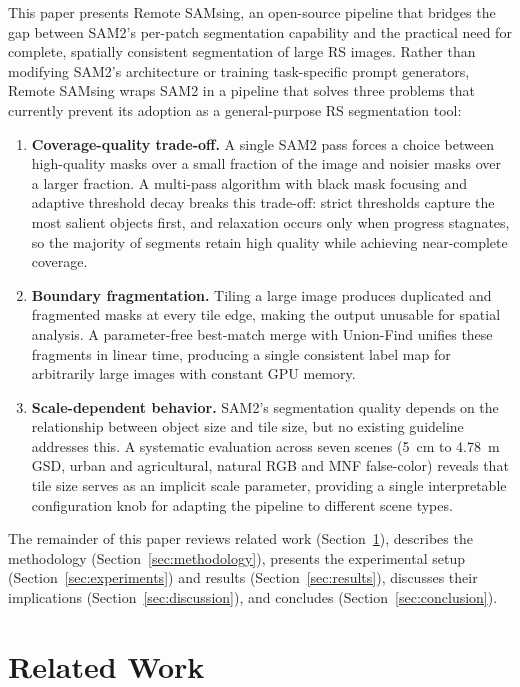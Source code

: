 \documentclass[review,11pt,authoryear]{elsarticle}
\begin{document}
This paper presents Remote SAMsing, an open-source pipeline that bridges the gap between SAM2's per-patch segmentation capability and the practical need for complete, spatially consistent segmentation of large RS images. Rather than modifying SAM2's architecture or training task-specific prompt generators, Remote SAMsing wraps SAM2 in a pipeline that solves three problems that currently prevent its adoption as a general-purpose RS segmentation tool:
\pagebreak
\begin{enumerate}
    \item \textbf{Coverage-quality trade-off.} A single SAM2 pass forces a choice between high-quality masks over a small fraction of the image and noisier masks over a larger fraction. A multi-pass algorithm with black mask focusing and adaptive threshold decay breaks this trade-off: strict thresholds capture the most salient objects first, and relaxation occurs only when progress stagnates, so the majority of segments retain high quality while achieving near-complete coverage.
    \item \textbf{Boundary fragmentation.} Tiling a large image produces duplicated and fragmented masks at every tile edge, making the output unusable for spatial analysis. A parameter-free best-match merge with Union-Find unifies these fragments in linear time, producing a single consistent label map for arbitrarily large images with constant GPU memory.
    \item \textbf{Scale-dependent behavior.} SAM2's segmentation quality depends on the relationship between object size and tile size, but no existing guideline addresses this. A systematic evaluation across seven scenes (5~cm to 4.78~m GSD, urban and agricultural, natural RGB and MNF false-color) reveals that tile size serves as an implicit scale parameter, providing a single interpretable configuration knob for adapting the pipeline to different scene types.
\end{enumerate}

The remainder of this paper reviews related work (Section~\ref{sec:related}), describes the methodology (Section~\ref{sec:methodology}), presents the experimental setup (Section~\ref{sec:experiments}) and results (Section~\ref{sec:results}), discusses their implications (Section~\ref{sec:discussion}), and concludes (Section~\ref{sec:conclusion}).


\section{Related Work}
\label{sec:related}
\end{document}
